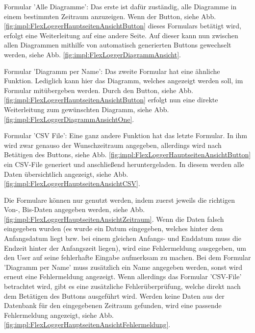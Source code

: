 \begin{compactitem}
    \item Formular 'Alle Diagramme': Das erste ist dafür zuständig, alle Diagramme in einem bestimmten Zeitraum anzuzeigen. Wenn der Button, siehe Abb. \ref{fig:impl:FlexLoggerHauptseitenAnsichtButton} dieses Formulars betätigt wird, erfolgt eine Weiterleitung auf eine andere Seite. Auf dieser kann nun zwischen allen Diagrammen mithilfe von automatisch generierten Buttons gewechselt werden, siehe Abb. \ref{fig:impl:FlexLoggerDiagrammAnsicht}.
    \item Formular 'Diagramm per Name': Das zweite Formular hat eine ähnliche Funktion. Lediglich kann hier das Diagramm, welches angezeigt werden soll, im Formular mitübergeben werden. Durch den Button, siehe Abb. \ref{fig:impl:FlexLoggerHauptseitenAnsichtButton} erfolgt nun eine direkte Weiterleitung zum gewünschten Diagramm, siehe Abb. \ref{fig:impl:FlexLoggerDiagrammAnsichtOne}.
    \item Formular 'CSV File': Eine ganz andere Funktion hat das letzte Formular. In ihm wird zwar genauso der Wunschzeitraum angegeben, allerdings wird nach Betätigen des Buttons, siehe Abb. \ref{fig:impl:FlexLoggerHauptseitenAnsichtButton} ein CSV-File generiert und anschließend heruntergeladen. In diesem werden alle Daten übersichtlich angezeigt, siehe Abb. \ref{fig:impl:FlexLoggerHauptseitenAnsichtCSV}.
    \end{compactitem}





Die Formulare können nur genutzt werden, indem zuerst jeweils die richtigen Von-, Bis-Daten angegeben werden, siehe Abb. \ref{fig:impl:FlexLoggerHauptseitenAnsichtZeitraum}. Wenn die Daten falsch eingegeben wurden (es wurde ein Datum eingegeben, welches hinter dem Anfangsdatum liegt bzw. bei einem gleichen Anfangs- und Enddatum muss die Endzeit hinter der Anfangszeit liegen), wird eine Fehlermeldung ausgegeben, um den User auf seine fehlerhafte Eingabe aufmerksam zu machen. Bei dem Formular 'Diagramm per Name' muss zusätzlich ein Name angegeben werden, sonst wird erneut eine Fehlermeldung angezeigt. Wenn allerdings das Formular 'CSV-File' betrachtet wird, gibt es eine zusätzliche Fehlerüberprüfung, welche direkt nach dem Betätigen des Buttons ausgeführt wird. Werden keine Daten aus der Datenbank für den eingegebenen Zeitraum gefunden, wird eine passende Fehlermeldung angezeigt, siehe Abb. \ref{fig:impl:FlexLoggerHauptseitenAnsichtFehlermeldung}.


